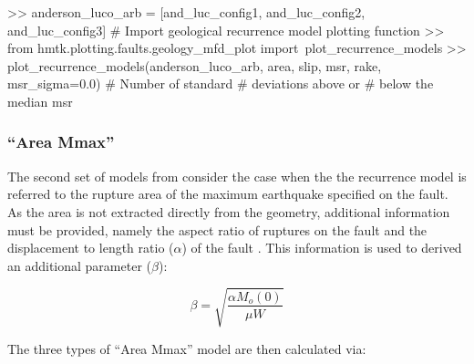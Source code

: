 \begin{python}[frame=single]
>> anderson_luco_arb = [and_luc_config1,
                        and_luc_config2,
                        and_luc_config3]
# Import geological recurrence model plotting function
>> from hmtk.plotting.faults.geology_mfd_plot import\
     plot_recurrence_models
>> plot_recurrence_models(anderson_luco_arb,
                          area,
                          slip,
                          msr,
                          rake,
                          msr_sigma=0.0) # Number of standard 
                                         # deviations above or
                                         # below the median msr 
\end{python}



\subsubsection{\textcite{AndersonLuco1983} ``Area Mmax''}

The second set of models from \textcite{AndersonLuco1983} consider the case when the the recurrence model is referred to the rupture area of the maximum earthquake specified on the fault. As the area is not extracted directly from the geometry, additional information must be provided, namely the aspect ratio of ruptures on the fault and the displacement to length ratio ($\alpha$) of the fault \parencite{Bungum2007}. This information is used to derived an additional parameter ($\beta$):

\begin{equation}
\beta=\sqrt{\frac{\alpha M_o \left( 0 \right)}{\mu W}}
\end{equation}

The three types of \textcite{AndersonLuco1983} ``Area Mmax'' model are then calculated via:

